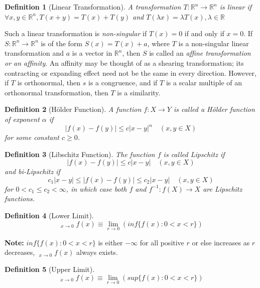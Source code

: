 \documentclass[12pt, a4paper]{article}
\DeclareMathOperator*\lowlim{\underline{lim}}
\DeclareMathOperator*\uplim{\overline{lim}}
\newtheorem{definition}{Definition}[subsection]
\begin{document}
\begin{definition}[Linear Transformation]
    A transformation $T : \mathbb{R}^n \rightarrow \mathbb{R}^n$ is linear 
    if $\forall x, y \in \mathbb{R}^n, T(x+y) = T(x) + T(y)$ and 
    $T(\lambda x) = \lambda T(x), \lambda \in\mathbb{R}$ 
\end{definition}

Such a linear transformation is \textit{non-singular} if $T(x)=0$ if and only if $x=0 .$ If 
$S: \mathbb{R}^{n} \rightarrow \mathbb{R}^{n}$ is of the form $S(x)=T(x)+a$, 
where $T$ is a non-singular linear transformation and $a$ is a vector in 
$\mathbb{R}^{n}$, then $S$ is called an \textit{affine transformation}\textit{ or an 
affinity}. An affinity may be thought of as a shearing transformation; 
its contracting or expanding effect need not be the same in every direction. 
However, if $T$ is orthonormal, then $s$ is a congruence, and if $T$ is a 
scalar multiple of an orthonormal transformation, then $T$ is a similarity.

\begin{definition}[Hölder Function]
    A function $f: X \rightarrow Y$ is called a Hölder function of exponent $\alpha$ if
$$
|f(x)-f(y)| \leq c|x-y|^{\alpha} \quad(x, y \in X)
$$
    for some constant $c\geq 0$.
\end{definition}

\begin{definition}[Libschitz Function]
    The function $f$ is called Lipschitz if
    $$
    |f(x)-f(y)| \leq c|x-y| \quad(x, y \in X)
    $$
    and bi-Lipschitz if 
    $$
    c_{1}|x-y| \leq |f(x)-f(y)| \leq c_{2}|x-y| \quad(x, y \in X)
    $$
    for $0<c_{1} \leq c_{2}<\infty$, in which case both $f$ and 
    $f^{-1}: f(X) \rightarrow X$ are Lipschitz functions.     
\end{definition}

\begin{definition}[Lower Limit]
    $$\displaystyle \lowlim_{x \to 0} f(x) \equiv \lim_{r\to 0}(inf\{f(x):0<x<r\})$$
\end{definition}

\textbf{Note:} $inf\{f(x):0<x<r\}$ is either $-\infty$ for all positive $r$ or else increases as $r$ decreases, 
$\lowlim_{x \to 0} f(x)$ always exists.

\begin{definition}[Upper Limit]
    $$\displaystyle \uplim_{x \to 0} f(x) \equiv  \lim_{r\to 0}(sup\{f(x):0<x<r\})$$
\end{definition}
\end{document}
